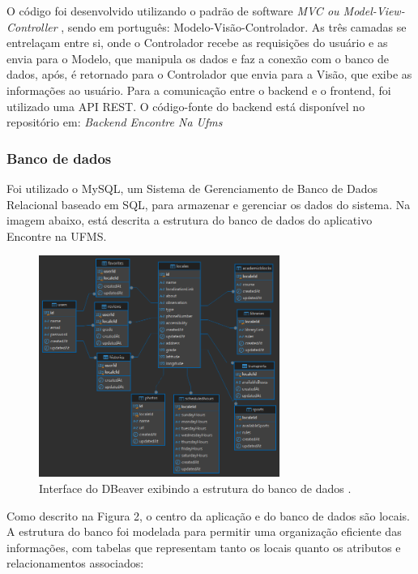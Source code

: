     O código foi desenvolvido utilizando o padrão de software \textit{MVC ou Model-View-Controller} \cite{mvc}, sendo em português: Modelo-Visão-Controlador. As três camadas se entrelaçam entre si, onde o Controlador recebe as requisições do usuário e as envia para o Modelo, que manipula os dados e faz a conexão com o banco de dados, após, é retornado para o Controlador que envia para a Visão, que exibe as informações ao usuário. Para a comunicação entre o backend e o frontend, foi utilizado uma API REST. O código-fonte do backend está disponível no repositório em: \textit{Backend Encontre Na Ufms} \cite{backend}

\subsubsection{Banco de dados}
    
    Foi utilizado o MySQL, um Sistema de Gerenciamento de Banco de Dados Relacional baseado em SQL, para armazenar e gerenciar os dados do sistema.  Na imagem abaixo, está descrita a estrutura do banco de dados do aplicativo Encontre na UFMS.

\begin{figure}[h]
    \centering
    \includegraphics[width=0.7\textwidth]{imagens/encontrenaufms.png}
    \caption{\scriptsize Interface do DBeaver exibindo a estrutura do banco de dados \cite{dbeaver}.}
    \label{fig:descricaoBancoDeDados}
\end{figure}

    Como descrito na Figura 2, o centro da aplicação e do banco de dados são locais. A estrutura do banco foi modelada para permitir uma organização eficiente das informações, com tabelas que representam tanto os locais quanto os atributos e relacionamentos associados:

